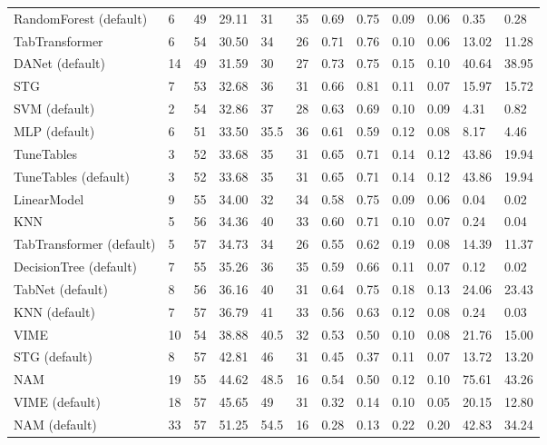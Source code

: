 \begin{tabular}{lllllrllllll}
RandomForest (default) & 6 & 49 & 29.11 & 31 & 35 & 0.69 & 0.75 & 0.09 & 0.06 & 0.35 & 0.28 \\
TabTransformer & 6 & 54 & 30.50 & 34 & 26 & 0.71 & 0.76 & 0.10 & 0.06 & 13.02 & 11.28 \\
DANet (default) & 14 & 49 & 31.59 & 30 & 27 & 0.73 & 0.75 & 0.15 & 0.10 & 40.64 & 38.95 \\
STG & 7 & 53 & 32.68 & 36 & 31 & 0.66 & 0.81 & 0.11 & 0.07 & 15.97 & 15.72 \\
SVM (default) & 2 & 54 & 32.86 & 37 & 28 & 0.63 & 0.69 & 0.10 & 0.09 & 4.31 & 0.82 \\
MLP (default) & 6 & 51 & 33.50 & 35.5 & 36 & 0.61 & 0.59 & 0.12 & 0.08 & 8.17 & 4.46 \\
TuneTables & 3 & 52 & 33.68 & 35 & 31 & 0.65 & 0.71 & 0.14 & 0.12 & 43.86 & 19.94 \\
TuneTables (default) & 3 & 52 & 33.68 & 35 & 31 & 0.65 & 0.71 & 0.14 & 0.12 & 43.86 & 19.94 \\
LinearModel & 9 & 55 & 34.00 & 32 & 34 & 0.58 & 0.75 & 0.09 & 0.06 & 0.04 & 0.02 \\
KNN & 5 & 56 & 34.36 & 40 & 33 & 0.60 & 0.71 & 0.10 & 0.07 & 0.24 & 0.04 \\
TabTransformer (default) & 5 & 57 & 34.73 & 34 & 26 & 0.55 & 0.62 & 0.19 & 0.08 & 14.39 & 11.37 \\
DecisionTree (default) & 7 & 55 & 35.26 & 36 & 35 & 0.59 & 0.66 & 0.11 & 0.07 & 0.12 & 0.02 \\
TabNet (default) & 8 & 56 & 36.16 & 40 & 31 & 0.64 & 0.75 & 0.18 & 0.13 & 24.06 & 23.43 \\
KNN (default) & 7 & 57 & 36.79 & 41 & 33 & 0.56 & 0.63 & 0.12 & 0.08 & 0.24 & 0.03 \\
VIME & 10 & 54 & 38.88 & 40.5 & 32 & 0.53 & 0.50 & 0.10 & 0.08 & 21.76 & 15.00 \\
STG (default) & 8 & 57 & 42.81 & 46 & 31 & 0.45 & 0.37 & 0.11 & 0.07 & 13.72 & 13.20 \\
NAM & 19 & 55 & 44.62 & 48.5 & 16 & 0.54 & 0.50 & 0.12 & 0.10 & 75.61 & 43.26 \\
VIME (default) & 18 & 57 & 45.65 & 49 & 31 & 0.32 & 0.14 & 0.10 & 0.05 & 20.15 & 12.80 \\
NAM (default) & 33 & 57 & 51.25 & 54.5 & 16 & 0.28 & 0.13 & 0.22 & 0.20 & 42.83 & 34.24 \\
\bottomrule
\end{tabular}
